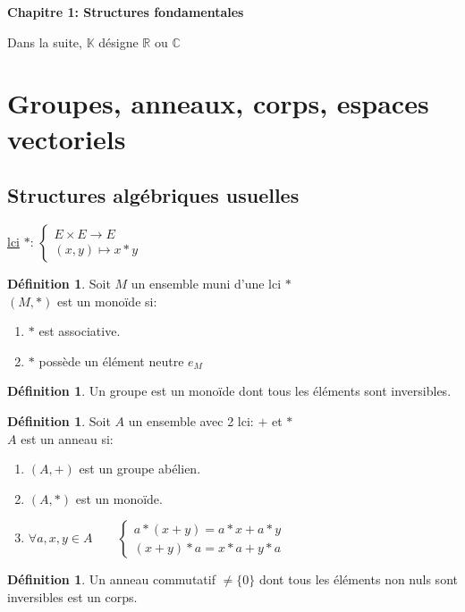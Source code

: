 \documentclass[10pt,a4paper]{article}
\theoremstyle{definition}
\newtheorem{definition}[proposition]{Définition}
\begin{document}
\begin{center}
{\Large \textbf{Chapitre 1: Structures fondamentales}}
\end{center}
Dans la suite, $\mathbb{K}$ désigne $\mathbb{R}$ ou $\mathbb{C}$

\section{Groupes, anneaux, corps, espaces vectoriels}
\subsection{Structures algébriques usuelles}
\uline{lci} $*$: $\begin{cases}
E \times E \to E \\
(x, y) \mapsto x * y
\end{cases}$
\begin{definition}
Soit $M$ un ensemble muni d'une lci $*$ \\
$(M, *)$ est un monoïde si:
\begin{enumerate}
\item $*$ est associative.
\item $*$ possède un élément neutre $e_M$
\end{enumerate}
\end{definition}
\begin{definition}
Un groupe est un monoïde dont tous les éléments sont inversibles.
\end{definition}
\begin{definition}
Soit $A$ un ensemble avec 2 lci: $+$ et $*$ \\
$A$ est un anneau si:
\begin{enumerate}
\item $(A, +)$ est un groupe abélien.
\item $(A, *)$ est un monoïde.
\item $\forall a, x, y \in A \qquad \begin{cases}
a * (x + y) = a * x + a * y \\
(x + y) * a = x * a + y * a
\end{cases}$
\end{enumerate}
\end{definition}
\begin{definition}
Un anneau commutatif $\neq \{ 0 \}$ dont tous les éléments non nuls sont inversibles est un corps.
\end{definition}
\end{document}
